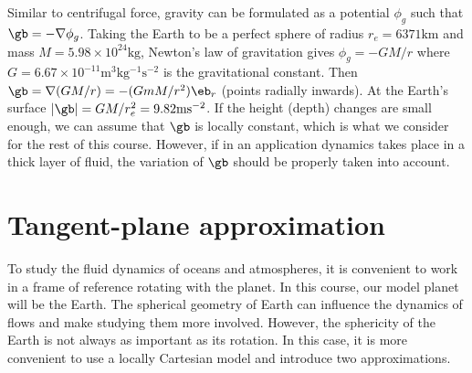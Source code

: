 \documentclass[
  letterpaper,
  twocolumn,
  landscape]{report}
\begin{document}
\begin{tcolorbox}[enhanced jigsaw, toprule=.15mm, left=2mm, opacityback=0, breakable, arc=.35mm, colback=white, rightrule=.15mm, bottomrule=.15mm, colframe=quarto-callout-note-color-frame, leftrule=.75mm]
\begin{minipage}[t]{5.5mm}
\textcolor{quarto-callout-note-color}{\faInfo}
\end{minipage}%
\begin{minipage}[t]{\textwidth - 5.5mm}

Similar to centrifugal force, gravity can be formulated as a potential
\(\phi_g\) such that \(\gb=-\nabla \phi_g\). Taking the Earth to be a
perfect sphere of radius \(r_e = 6371\mathrm{km}\) and mass
\(M=5.98\times10^{24}\mathrm{kg}\), Newton's law of gravitation gives
\(\phi_g = -GM/r\) where
\(G=6.67\times10^{-11}\mathrm{m^3kg^{-1}s^{-2}}\) is the gravitational
constant. Then \(\gb=\nabla(GM/r)=-(GmM/r^2)\eb_r\) (points radially
inwards). At the Earth's surface
\(|\gb|=GM/r_e^2=9.82\mathrm{ms^{-2}}\). If the height (depth) changes
are small enough, we can assume that \(\gb\) is locally constant, which
is what we consider for the rest of this course. However, if in an
application dynamics takes place in a thick layer of fluid, the
variation of \(\gb\) should be properly taken into account.

\end{minipage}%
\end{tcolorbox}

\hypertarget{sec-tang_plane_approx}{%
\section{Tangent-plane approximation}\label{sec-tang_plane_approx}}

To study the fluid dynamics of oceans and atmospheres, it is convenient
to work in a frame of reference rotating with the planet. In this
course, our model planet will be the Earth. The spherical geometry of
Earth can influence the dynamics of flows and make studying them more
involved. However, the sphericity of the Earth is not always as
important as its rotation. In this case, it is more convenient to use a
locally Cartesian model and introduce two approximations.
\end{document}
